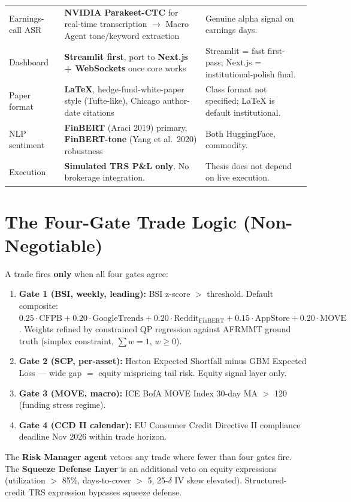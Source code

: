\documentclass[11pt]{article}
\begin{document}
{\begin{longtable}{@{}p{3.2cm} p{4.8cm} p{7.5cm}@{}}
Earnings-call ASR & \textbf{NVIDIA Parakeet-CTC} for real-time transcription $\to$ Macro Agent tone/keyword extraction & Genuine alpha signal on earnings days. \\
Dashboard & \textbf{Streamlit first}, port to \textbf{Next.js + WebSockets} once core works & Streamlit = fast first-pass; Next.js = institutional-polish final. \\
Paper format & \textbf{LaTeX}, hedge-fund-white-paper style (Tufte-like), Chicago author-date citations & Class format not specified; LaTeX is default institutional. \\
NLP sentiment & \textbf{FinBERT} (Araci 2019) primary, \textbf{FinBERT-tone} (Yang et al.\ 2020) robustness & Both HuggingFace, commodity. \\
Execution & \textbf{Simulated TRS P\&L only}. No brokerage integration. & Thesis does not depend on live execution. \\
\bottomrule
\end{longtable}
}

\section{The Four-Gate Trade Logic (Non-Negotiable)}

A trade fires \textbf{only} when all four gates agree:

\begin{enumerate}
  \item \textbf{Gate 1 (BSI, weekly, leading):} BSI z-score $>$ threshold. Default composite: $0.25 \cdot \mathrm{CFPB} + 0.20 \cdot \mathrm{GoogleTrends} + 0.20 \cdot \mathrm{Reddit}_{\mathrm{FinBERT}} + 0.15 \cdot \mathrm{AppStore} + 0.20 \cdot \mathrm{MOVE}$. Weights refined by constrained QP regression against AFRMMT ground truth (simplex constraint, $\sum w = 1$, $w \ge 0$).
  \item \textbf{Gate 2 (SCP, per-asset):} Heston Expected Shortfall minus GBM Expected Loss --- wide gap $=$ equity mispricing tail risk. Equity signal layer only.
  \item \textbf{Gate 3 (MOVE, macro):} ICE BofA MOVE Index 30-day MA $>$ 120 (funding stress regime).
  \item \textbf{Gate 4 (CCD II calendar):} EU Consumer Credit Directive II compliance deadline Nov 2026 within trade horizon.
\end{enumerate}

The \textbf{Risk Manager agent} vetoes any trade where fewer than four gates fire. The \textbf{Squeeze Defense Layer} is an additional veto on equity expressions (utilization $>$ 85\%, days-to-cover $>$ 5, 25-$\delta$ IV skew elevated). Structured-credit TRS expression bypasses squeeze defense.
\end{document}

